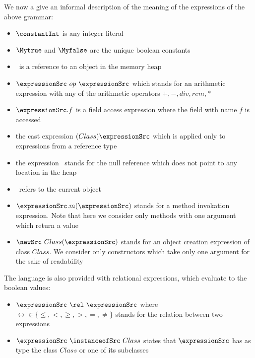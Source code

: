     
We now  a give an informal description of the meaning of the expressions of the above grammar:
\begin{itemize}
   
   \item $ \constantInt  $ is any integer literal 
   

   \item  $ \Mytrue$ and $\Myfalse$ are the unique boolean  constants 

   \item \constantRef \ is a reference to an object in the memory heap
   
   \item  $\expressionSrc \ op \ \expressionSrc$ which stands for an arithmetic expression with any of the arithmetic 
          operators $ + , - , div , rem, * $
	   
   
   
   \item $ \expressionSrc.f $ is a field access expression where the field with name $f$ is accessed

   \item the cast expression $(Class) \expressionSrc$  which is applied only to expressions from a reference type
   
   \item the expression \Mynull \ stands for the null reference which does not point to any location in the heap
  
   \item \this \ refers to the current object 
   \item $ \expressionSrc.m(\expressionSrc)  $ stands for a method invokation expression. Note that here we consider
         only methods with one argument which return a value
   \item $\newSrc \ Class(\expressionSrc )$ stands for an object creation expression of class $Class$. We consider only constructors which take
         only one argument for the sake of readability 
 

   
\end{itemize}




The language is also provided with relational expressions, which evaluate to the boolean values: 

\begin{itemize}
   
   \item $\expressionSrc \ \rel \ \expressionSrc $ where $\rel  \in \{ \le, < ,  \ge, >, = , \neq \} $ stands for the relation between two expressions 
   
   \item  $\expressionSrc \ \instanceofSrc \ Class $ states that $\expressionSrc$ has as type the class $Class $ or one of its subclasses 
\end{itemize}






